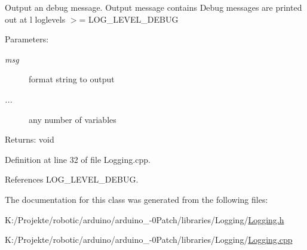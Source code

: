 Output an debug message. Output message contains Debug messages are printed out at l loglevels $>$= LOG\_\-LEVEL\_\-DEBUG

\begin{Desc}
\item[Parameters:]
\begin{description}
\item[{\em msg}]format string to output \item[{\em ...}]any number of variables \end{description}
\end{Desc}
\begin{Desc}
\item[Returns:]void \end{Desc}


Definition at line 32 of file Logging.cpp.

References LOG\_\-LEVEL\_\-DEBUG.

The documentation for this class was generated from the following files:\begin{CompactItemize}
\item 
K:/Projekte/robotic/arduino/arduino\_-0Patch/libraries/Logging/\hyperlink{_logging_8h}{Logging.h}\item 
K:/Projekte/robotic/arduino/arduino\_-0Patch/libraries/Logging/\hyperlink{_logging_8cpp}{Logging.cpp}\end{CompactItemize}
